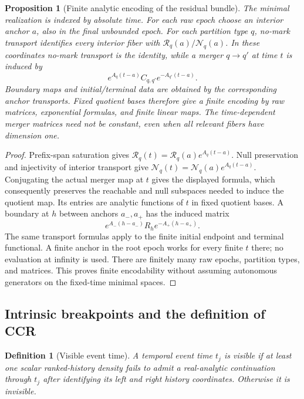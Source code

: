 \documentclass[11pt]{article}
\newtheorem{proposition}[theorem]{Proposition}
\newtheorem{definition}[theorem]{Definition}
\newcommand{\cR}{\mathcal R}
\newcommand{\cN}{\mathcal N}
\begin{document}
\begin{proposition}[Finite analytic encoding of the residual bundle]
\label{prop:residual-encoding}
The minimal realization is indexed by absolute time.  For each raw epoch choose an interior anchor $a$, also in the final unbounded epoch.  For each partition type $q$, no-mark transport identifies every interior fiber with $\cR_q(a)/\cN_q(a)$.  In these coordinates no-mark transport is the identity, while a merger $q\to q'$ at time $t$ is induced by
\[
e^{A_q(t-a)}C_{q,q'}e^{-A_{q'}(t-a)}.
\]
Boundary maps and initial/terminal data are obtained by the corresponding anchor transports.  Fixed quotient bases therefore give a finite encoding by raw matrices, exponential formulas, and finite linear maps.  The time-dependent merger matrices need not be constant, even when all relevant fibers have dimension one.
\end{proposition}

\begin{proof}
Prefix-span saturation gives $\cR_q(t)=\cR_q(a)e^{A_q(t-a)}$.  Null preservation and injectivity of interior transport give $\cN_q(t)=\cN_q(a)e^{A_q(t-a)}$.  Conjugating the actual merger map at $t$ gives the displayed formula, which consequently preserves the reachable and null subspaces needed to induce the quotient map.  Its entries are analytic functions of $t$ in fixed quotient bases.  A boundary at $h$ between anchors $a_-,a_+$ has the induced matrix
\[
e^{A_-(h-a_-)}R_h e^{-A_+(h-a_+)}.
\]
The same transport formulas apply to the finite initial endpoint and terminal functional.  A finite anchor in the root epoch works for every finite $t$ there; no evaluation at infinity is used.  There are finitely many raw epochs, partition types, and matrices.  This proves finite encodability without assuming autonomous generators on the fixed-time minimal spaces.
\end{proof}

\subsection{Intrinsic breakpoints and the definition of CCR}

\begin{definition}[Visible event time]
A temporal event time $t_j$ is \emph{visible} if at least one scalar ranked-history density fails to admit a real-analytic continuation through $t_j$ after identifying its left and right history coordinates.  Otherwise it is \emph{invisible}.
\end{definition}
\end{document}
